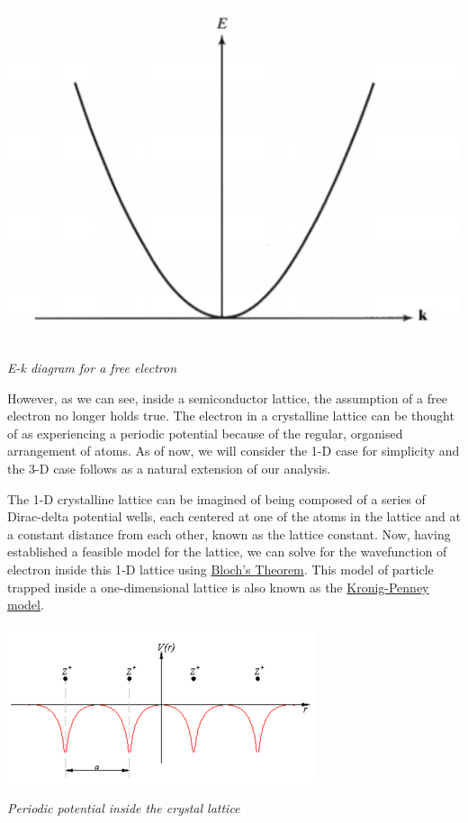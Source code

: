 \documentclass[12 pt]{article}
\begin{document}
  \par
  \begin{center}
   \includegraphics{1BRam.png}
   \end{center}
    \begin{center}
      \emph{E-k diagram for a free electron}
  \end{center}

\par 
However, as we can see, inside a semiconductor lattice, the assumption of a free electron no longer holds true. The electron in a crystalline lattice can be thought of as experiencing a periodic potential because of the regular, organised arrangement of atoms. As of now, we will consider the 1-D case for simplicity and the 3-D case follows as a natural extension of our analysis. \par
The 1-D crystalline lattice can be imagined of being composed of a series of Dirac-delta potential wells, each centered at one of the atoms in the lattice and at a constant distance from each other, known as the lattice constant. Now, having established a feasible model for the lattice, we can solve for the wavefunction of electron inside this 1-D lattice using \href{https://en.wikipedia.org/wiki/Bloch%27s_theorem} {Bloch's Theorem}. This 
model of particle trapped inside a one-dimensional lattice is also known as the \href{https://en.wikipedia.org/wiki/Electronic_band_structure}{Kronig-Penney model}. 

\par
\begin{center}
   \includegraphics{Potential-actual_2_70.png}
    \end{center}
    \begin{center}
      \emph{Periodic potential inside the crystal lattice}
  \end{center}
\par
\end{document}
